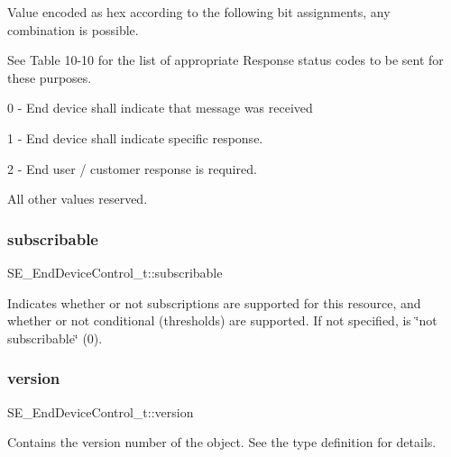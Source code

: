 Value encoded as hex according to the following bit assignments, any combination is possible.

See Table 10-\/10 for the list of appropriate Response status codes to be sent for these purposes.

0 -\/ End device shall indicate that message was received

1 -\/ End device shall indicate specific response.

2 -\/ End user / customer response is required.

All other values reserved. \mbox{\label{group__EndDeviceControl_gaa9263c27137bebba854f6e4a0bebdd51}} 
\subsubsection{\texorpdfstring{subscribable}{subscribable}}
{\footnotesize\ttfamily S\+E\+\_\+\+End\+Device\+Control\+\_\+t\+::subscribable}

Indicates whether or not subscriptions are supported for this resource, and whether or not conditional (thresholds) are supported. If not specified, is \char`\"{}not subscribable\char`\"{} (0). \mbox{\label{group__EndDeviceControl_gaf064d7556402ba5286fe5ced5ce2a4f4}} 
\subsubsection{\texorpdfstring{version}{version}}
{\footnotesize\ttfamily S\+E\+\_\+\+End\+Device\+Control\+\_\+t\+::version}

Contains the version number of the object. See the type definition for details. 